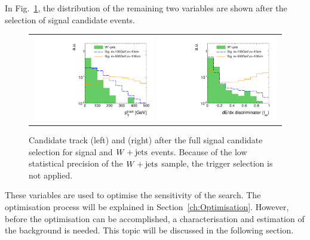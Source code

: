 In Fig.~\ref{fig:PtAndIasAfterFullPreselection}, the distribution of the remaining two variables are shown after the selection of signal candidate events.
\begin{figure}[!h]
  \centering 
  \begin{tabular}{c}
    \includegraphics[width=0.49\textwidth]{figures/analysis/AnalysisSelection/chiTracksfullSelectionNoTriggerCuts_Wjets/htrackPtSmallRangeCoarseBinning_log.pdf}
    \includegraphics[width=0.49\textwidth]{figures/analysis/AnalysisSelection/chiTracksfullSelectionNoTriggerCuts_Wjets/htrackASmiSmallRange_log.pdf}
  \end{tabular}
  \caption{Candidate track \pt (left) and \ias (right) after the full signal candidate selection for signal and $W+\text{jets}$ events. 
           Because of the low statistical precision of the $W+\text{jets}$ sample, the trigger selection is not applied.
           }
  \label{fig:PtAndIasAfterFullPreselection}
\end{figure}
These variables are used to optimise the sensitivity of the search.
The optimisation process will be explained in Section~\ref{ch:Optimisation}.
However, before the optimisation can be accomplished, a characterisation and estimation of the background is needed.
This topic will be discussed in the following section.

